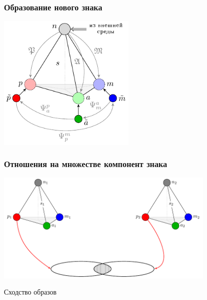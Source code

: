 \documentclass[default]{beamer}
\begin{document}
	\begin{frame}
		\frametitle{Образование нового знака}
		\centering
		\includegraphics[width=0.5\textwidth]{signs/sign_naming_colored}
	\end{frame}		
	
	\begin{frame}
		\frametitle{Отношения на множестве компонент знака}
		\centering
		\includegraphics[page=1,width=0.8\textwidth]{signs/sign_relations}
		
		Сходство образов
	\end{frame}	
	
\end{document}
